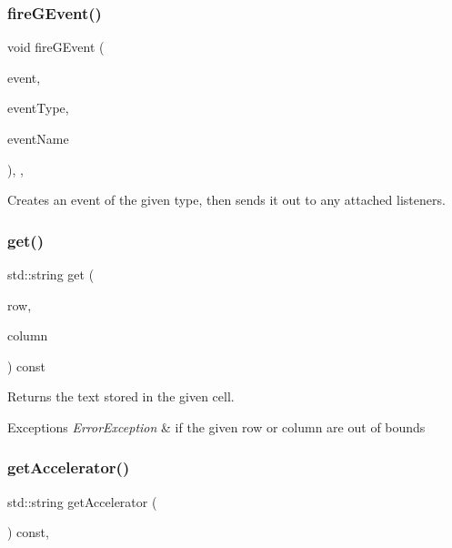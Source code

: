 \subsubsection{\texorpdfstring{fire\+G\+Event()}{fireGEvent()}\hspace{0.1cm}{\footnotesize\ttfamily [8/8]}}
{\footnotesize\ttfamily void fire\+G\+Event (\begin{DoxyParamCaption}\item[{Q\+Window\+State\+Change\+Event $\ast$}]{event,  }\item[{Event\+Type}]{event\+Type,  }\item[{const std\+::string \&}]{event\+Name }\end{DoxyParamCaption})\hspace{0.3cm}{\ttfamily [protected]}, {\ttfamily [virtual]}, {\ttfamily [inherited]}}



Creates an event of the given type, then sends it out to any attached listeners. 

\mbox{\label{classGTable_aaa9971dcb7e1b082abd3b9010667f041}} 
\subsubsection{\texorpdfstring{get()}{get()}}
{\footnotesize\ttfamily std\+::string get (\begin{DoxyParamCaption}\item[{int}]{row,  }\item[{int}]{column }\end{DoxyParamCaption}) const\hspace{0.3cm}{\ttfamily [virtual]}}



Returns the text stored in the given cell. 


\begin{DoxyExceptions}{Exceptions}
{\em Error\+Exception} & if the given row or column are out of bounds \\
\hline
\end{DoxyExceptions}
\mbox{\label{classGInteractor_a69f8d23ed8f207fbecad99960776e942}} 
\subsubsection{\texorpdfstring{get\+Accelerator()}{getAccelerator()}}
{\footnotesize\ttfamily std\+::string get\+Accelerator (\begin{DoxyParamCaption}{ }\end{DoxyParamCaption}) const\hspace{0.3cm}{\ttfamily [virtual]}, {\ttfamily [inherited]}}



